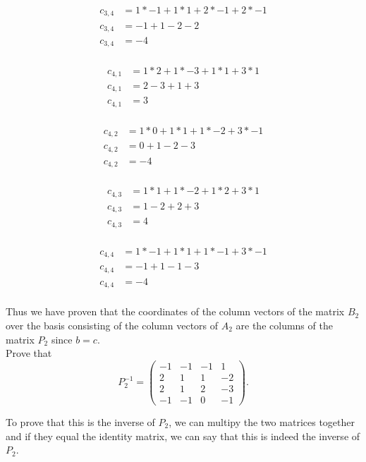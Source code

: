 \documentclass[12pt]{article}
\begin{document}
\begin{itemize}
\begin{align*}
    c_{3,4} &= 1 * -1 + 1 * 1 + 2 * -1 + 2 * -1 \\
    c_{3,4} &= -1 + 1 - 2 - 2 \\
    c_{3,4} &= -4  \\
\end{align*}

\begin{align*}
    c_{4,1} &= 1 * 2 + 1 * -3 + 1 * 1 + 3 * 1 \\
    c_{4,1} &= 2 - 3 + 1 + 3 \\
    c_{4,1} &= 3  \\
\end{align*}

\begin{align*}
    c_{4,2} &= 1 * 0 + 1 * 1 + 1 * -2 + 3 * -1 \\
    c_{4,2} &= 0 + 1 - 2 - 3 \\
    c_{4,2} &= -4  \\
\end{align*}

\begin{align*}
    c_{4,3} &= 1 * 1 + 1 * -2 + 1 * 2 + 3 * 1 \\
    c_{4,3} &= 1 - 2 + 2 + 3 \\
    c_{4,3} &= 4  \\
\end{align*}

\begin{align*}
    c_{4,4} &= 1 * -1 + 1 * 1 + 1 * -1 + 3 * -1 \\
    c_{4,4} &= -1 + 1 - 1 - 3 \\
    c_{4,4} &= -4  \\
\end{align*}

Thus we have proven that the coordinates of the column vectors of the matrix $B_2$ over the basis consisting of the column vectors of $A_2$ are the columns of the matrix $P_2$ since $b = c$. \\

Prove that
\[
P_2^{-1} = 
\begin{pmatrix}
-1 & -1 & -1 & 1\\
2 & 1 & 1 & -2 \\
2 & 1 & 2 & -3 \\
-1 & -1 & 0 & -1
\end{pmatrix} .
\]

To prove that this is the inverse of $P_2$, we can multipy the two matrices together and if they equal the identity matrix, we can say that this is indeed the inverse of $P_2$.


\end{itemize}
\end{document}
